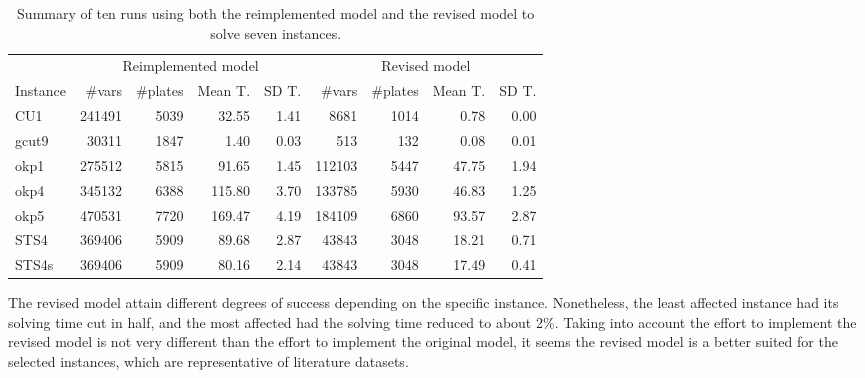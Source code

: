 \documentclass[runningheads]{llncs}
\begin{document}
\begin{table}
\caption{Summary of ten runs using both the reimplemented model and the revised model to solve seven instances.}
\setlength\tabcolsep{2.5px}
\def\arraystretch{1.1}
\begin{tabular}{@{\extracolsep{4pt}}lrrrrrrrr@{}}
& \multicolumn{4}{c}{Reimplemented model} & \multicolumn{4}{c}{Revised model}\\
\cline{2-5}\cline{6-9}
Instance & \#vars & \#plates & Mean T. & SD T. & \#vars & \#plates & Mean T. & SD T.\\
\hline
CU1 & 241491 & 5039 & 32.55 & 1.41 & 8681 & 1014 & 0.78 & 0.00 \\
gcut9 & 30311 & 1847 & 1.40 & 0.03 & 513 & 132 & 0.08 & 0.01 \\
okp1 & 275512 & 5815 & 91.65 & 1.45 & 112103 & 5447 & 47.75 & 1.94 \\
okp4 & 345132 & 6388 & 115.80 & 3.70 & 133785 & 5930 & 46.83 & 1.25 \\
okp5 & 470531 & 7720 & 169.47 & 4.19 & 184109 & 6860 & 93.57 & 2.87 \\
STS4 & 369406 & 5909 & 89.68 & 2.87 & 43843 & 3048 & 18.21 & 0.71 \\
STS4s & 369406 & 5909 & 80.16 & 2.14 & 43843 & 3048 & 17.49 & 0.41 \\
\hline
\end{tabular}
\label{tab:seven_instances}
\end{table}

The revised model attain different degrees of success depending on the specific instance.
Nonetheless, the least affected instance had its solving time cut in half, and the most affected had the solving time reduced to about 2\%.
Taking into account the effort to implement the revised model is not very different than the effort to implement the original model, it seems the revised model is a better suited for the selected instances, which are representative of literature datasets.

\end{document}
